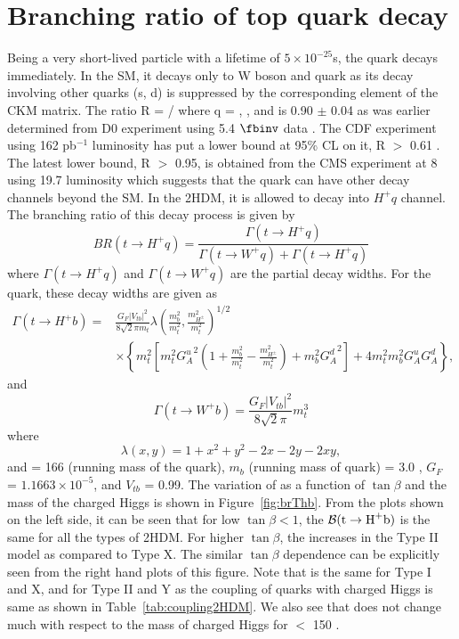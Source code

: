 \section{Branching ratio of top quark decay}
\label{s:brThb}
Being a very short-lived particle with a lifetime of $5\times 10^{-25}$\unit{s}, the
\PQt quark decays immediately. In the SM, it decays only to W boson
and \PQb quark as its decay involving other quarks (s, d) is suppressed
by the corresponding element of the CKM matrix. The ratio R = \brTwb/\brTwq 
where q = \PQb, \PQs, and \PQd is 0.90 $\pm$ 0.04 as was earlier 
determined from D0 experiment using 5.4 $\fbinv$ 
data \cite{PhysRevLett.107.121802}. The CDF experiment using 162 
pb$^{-1}$ luminosity has put a lower bound at 95\% CL on it, 
R $>$ 0.61 \cite{PhysRevLett.95.102002}. The latest lower bound, R $>$ 
0.95, is obtained from the CMS experiment at 8 \TeV using 19.7\fbinv 
luminosity \cite{Khachatryan:2014nda}  which suggests that the \PQt 
quark can have other decay channels beyond the SM. In the 2HDM, it is allowed to 
decay into $H^+q$ channel. The branching ratio of this decay process is given by
\begin{equation}
BR(t\to H^+q) = \frac{\Gamma(t\to H^+q)}{\Gamma(t\to W^+q)+\Gamma(t\to H^+q)}
\label{eq:brThb}
\end{equation}
where $\Gamma(t\to H^+q)$ and $\Gamma(t\to W^+q)$ are the partial decay widths. 
For the \PQb quark, these decay widths are given as \cite{PhysRevD.80.015017}
\begin{align}
\Gamma(t\to H^+b) =&
\frac{G_F\left|V_{tb}\right|^2}{8\sqrt2\pi m_t}
\lambda\left(\frac{m_b^2}{m_t^2},\frac{m_{H^\pm}^2}{m_t^2}\right)^{1/2}
\nonumber\\
&\times
\left\{m_t^2\left[m_t^2{G_A^u}^2\left(1+\frac{m_b^2}{m_t^2}-\frac{m_{H^\pm}^2}{m_t^2}\right)+m_b^2{G_A^d}^2\right]
+4m_t^2m_b^2G_A^uG_A^d\right\},
\end{align}
and 
\begin{equation}
\Gamma(t\to W^+b) = \frac{G_F\left|V_{tb}\right|^2}{8\sqrt2\pi}m_t^3
\end{equation}
where
\begin{equation}
\lambda(x,y) = 1+x^2+y^2-2x-2y-2xy,
\end{equation}
and \mt = 166 \GeV (running mass of the \PQt quark), $m_b$ (running mass of \PQb quark) = 3.0 \GeV, $G_{F}$ = 
$1.1663\times 10^{-5}$, and $V_{tb}$ = 0.99. The variation of \brThb as 
a function of $\tan\beta$ and the mass of the charged Higgs is shown in Figure~\ref{fig:brThb}. 
From the plots shown on the left side, it can be seen that for low $\tan\beta < 1$, the $\mathcal{B}(\text{t} \rightarrow \text{H}^+ \text{b})$ is 
the same for all the types 
of 2HDM. For higher $\tan\beta$, the \brThb increases in the Type II model as compared to Type X.
The similar $\tan\beta$ dependence can be explicitly seen from the right hand plots of this figure. Note that \brThb is the same for Type I and X, and for Type II and Y as the coupling 
of quarks with charged Higgs is same as shown in Table~\ref{tab:coupling2HDM}. 
We also see that \brThb does not change much with respect to the mass of charged Higgs
for \mHp $<$ 150 \GeV.

